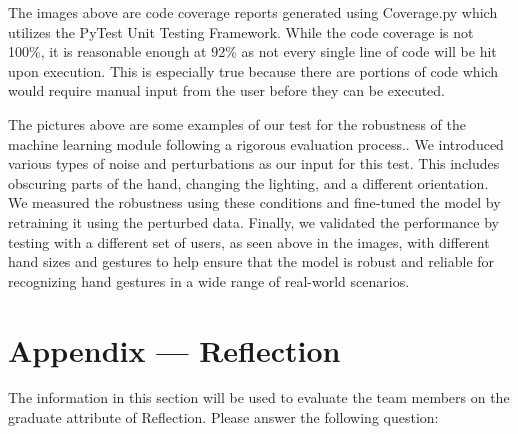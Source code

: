 \documentclass[12pt, titlepage]{article}
\begin{document}
The images above are code coverage reports generated using Coverage.py which utilizes the PyTest Unit Testing Framework. 
While the code coverage is not 100\%, it is reasonable enough at 92\% as not every single line of code will be hit upon execution. 
This is especially true because there are portions of code which would require manual input from the user before they can be executed.





The pictures above are some examples of our test for the robustness of the machine learning module following a 
rigorous evaluation process.. We introduced various types of noise and perturbations as our input for this test.
 This includes obscuring parts of the hand, changing the lighting, and a different orientation. We measured 
 the robustness using these conditions and fine-tuned the model by retraining it using the perturbed data. 
 Finally, we validated the performance by testing with a different set of users, as seen above in the images,
  with different hand sizes and gestures to help ensure that the model is robust and reliable for recognizing 
  hand gestures in a wide range of real-world scenarios.

\newpage{}
\section*{Appendix --- Reflection}

The information in this section will be used to evaluate the team members on the
graduate attribute of Reflection.  Please answer the following question:
\end{document}
